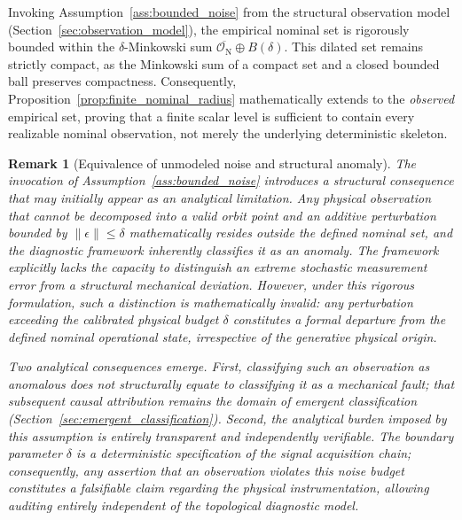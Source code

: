 \documentclass[a4paper]{cas-sc}
\newtheorem{remark}{Remark}
\begin{document}
Invoking Assumption~\ref{ass:bounded_noise} from the structural observation model (Section~\ref{sec:observation_model}), the empirical nominal set is rigorously bounded within the \(\delta\)-Minkowski sum \(\overline{\mathcal{O}_{\mathrm N}}\oplus B(\delta)\). This dilated set remains strictly compact, as the Minkowski sum of a compact set and a closed bounded ball preserves compactness. Consequently, Proposition~\ref{prop:finite_nominal_radius} mathematically extends to the \emph{observed} empirical set, proving that a finite scalar level is sufficient to contain every realizable nominal observation, not merely the underlying deterministic skeleton.

\begin{remark}[Equivalence of unmodeled noise and structural anomaly]
\label{rem:noise_is_anomaly}
The invocation of Assumption~\ref{ass:bounded_noise} introduces a structural consequence that may initially appear as an analytical limitation. Any physical observation that cannot be decomposed into a valid orbit point and an additive perturbation bounded by \(\lVert\epsilon\rVert \le \delta\) mathematically resides outside the defined nominal set, and the diagnostic framework inherently classifies it as an anomaly. The framework explicitly lacks the capacity to distinguish an extreme stochastic measurement error from a structural mechanical deviation. However, under this rigorous formulation, such a distinction is mathematically invalid: any perturbation exceeding the calibrated physical budget \(\delta\) constitutes a formal departure from the defined nominal operational state, irrespective of the generative physical origin.

Two analytical consequences emerge. First, classifying such an observation as anomalous does not structurally equate to classifying it as a mechanical fault; that subsequent causal attribution remains the domain of emergent classification (Section~\ref{sec:emergent_classification}). Second, the analytical burden imposed by this assumption is entirely transparent and independently verifiable. The boundary parameter \(\delta\) is a deterministic specification of the signal acquisition chain; consequently, any assertion that an observation violates this noise budget constitutes a falsifiable claim regarding the physical instrumentation, allowing auditing entirely independent of the topological diagnostic model.
\end{remark}
\end{document}
